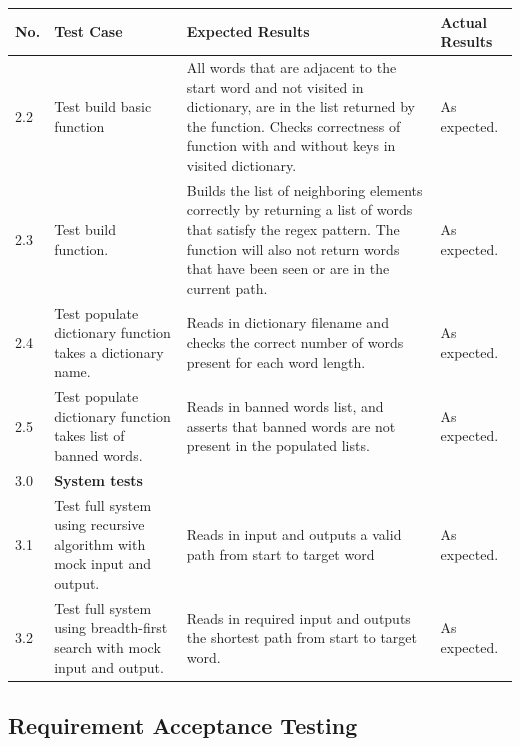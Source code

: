 \documentclass[12pt, a4]{report}
\begin{document}
		\pagebreak[4]
			
		\begin{tabular}{ |p{0.5cm}|p{5cm}|p{5cm}|p{5cm}| } 
			\hline
			No. & Test Case & Expected Results & Actual Results \\
			\hline
			2.2 & Test build basic function & All words that are adjacent to the start word and not visited in dictionary, are in the list returned by the function. Checks correctness of function with and without keys in visited dictionary. & As expected. \\
			2.3 & Test build function. & Builds the list of neighboring elements correctly by returning a list of words that satisfy the regex pattern. The function will also not return words that have been seen or are in the current path.  & As expected.\\
			2.4 & Test populate dictionary function takes a dictionary name. & Reads in dictionary filename and checks the correct number of words present for each word length. & As expected. \\
			2.5 & Test populate dictionary function takes list of banned words. & Reads in banned words list, and asserts that banned words are not present in the populated lists. & As expected. \\
			3.0 & \textbf{System tests} &  &  \\
			3.1 & Test full system using recursive algorithm with mock input and output. & Reads in input and outputs a valid path from start to target word & As expected. \\
			3.2 & Test full system using breadth-first search with mock input and output. & Reads in required input and outputs the shortest path from start to target word. & As expected. \\
			\hline
		\end{tabular}
	\newpage
	\subsection{Requirement Acceptance Testing}
	
\end{document}
